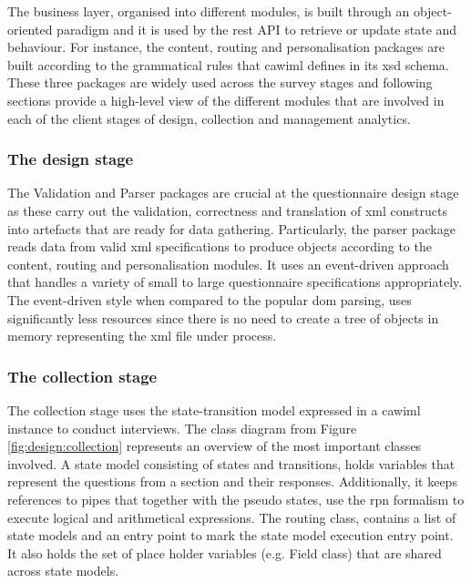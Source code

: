 	The business layer, organised into different modules, is built through an object-oriented paradigm and it is used by the \gls{rest} API to retrieve or update state and behaviour. For instance, the content, routing and personalisation packages are built according to the grammatical rules that \gls{cawiml} defines in its \gls{xsd} schema. These three packages are widely used across the survey stages and following sections provide a high-level view of the different modules that are involved in each of the client stages of design, collection and management analytics.

	\subsubsection{The design stage}

	The Validation and Parser packages are crucial at the questionnaire design stage as these carry out the validation, correctness and translation of \gls{xml} constructs into artefacts that are ready for data gathering. Particularly, the parser package reads data from valid \gls{xml} specifications to produce objects according to the content, routing and personalisation modules. It uses an event-driven approach that handles a variety of small to large questionnaire specifications appropriately. The event-driven style when compared to the popular \gls{dom} parsing, uses significantly less resources since there is no need to create a tree of objects in memory representing the \gls{xml} file under process.

	\subsubsection{The collection stage}

	The collection stage uses the state-transition model expressed in a \gls{cawiml} instance to conduct interviews. The class diagram from Figure \ref{fig:design:collection} represents an overview of the most important classes involved. A state model consisting of states and transitions, holds variables that represent the questions from a section and their responses. Additionally, it keeps references to pipes that together with the pseudo states, use the \gls{rpn} formalism to execute logical and arithmetical expressions. The routing class, contains a list of state models and an entry point to mark the state model execution entry point. It also holds the set of place holder variables (e.g. Field class) that are shared across state models.

